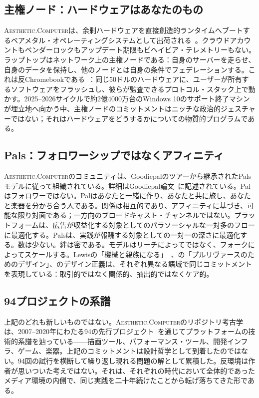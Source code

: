 \documentclass[10pt,letterpaper,twocolumn]{article}
\newcommand{\ac}{\textsc{Aesthetic.Computer}}
\begin{document}
\subsection{主権ノード：ハードウェアはあなたのもの}

\ac{}は、余剰ハードウェアを直接創造的ランタイムへブートするベアメタル・オペレーティングシステムとして出荷される~\citep{scudder2026os, scudder2026identity}。クラウドアカウントもベンダーロックもアップデート期限もビヘイビア・テレメトリーもない。ラップトップはネットワーク上の主権ノードである：自身のサーバーを走らせ、自身のデータを保持し、他のノードとは自身の条件でフェデレーションする。これは反Chromebookである~\citep{scudder2026openschools}：同じ50ドルのハードウェアに、ユーザーが所有するソフトウェアをフラッシュし、彼らが監査できるプロトコル・スタック上で動かす。2025--2026サイクルで約2億4000万台のWindows 10のサポート終了マシンが埋立地へ向かう中、主権ノードのコミットメントはニッチな政治的ジェスチャーではない；それはハードウェアをどうするかについての物質的プログラムである。

\subsection{Pals：フォロワーシップではなくアフィニティ}

\ac{}のコミュニティは、Goodiepalのツアーから継承されたPalsモデルに従って組織されている。詳細はGoodiepal論文~\citep{scudder2026goodiepal}に記述されている。Palはフォロワーではない。Palはあなたと一緒に作り、あなたと共に旅し、あなたと楽器を分かち合う人である。関係は相互的であり、アフィニティに基づき、可能な限り対面である；一方向のブロードキャスト・チャンネルではない。プラットフォームは、広告が収益化する対象としてのパラソーシャルな一対多のフローに最適化する。Palsは、実践が報酬する対象としての一対一の深さに最適化する。数は少ない。絆は密である。モデルはリーチによってではなく、フォークによってスケールする。Lewisの「機械と親族になる」~\citep{lewis2018making}、\citet{escobar2018designs}の「プルリヴァースのためのデザイン」、\citet{costanzachock2020design}のデザイン正義は、それぞれ異なる語域で同じコミットメントを表現している：取引的ではなく関係的、抽出的ではなくケア的。

\subsection{94プロジェクトの系譜}

上記のどれも新しいものではない。\ac{}のリポジトリ考古学は、2007--2020年にわたる94の先行プロジェクト~\citep{scudder2026archaeology}を通じてプラットフォームの技術的系譜を辿っている——描画ツール、パフォーマンス・ツール、開発インフラ、ゲーム、楽器。上記のコミットメントは設計哲学として到着したのではない。94回の試行を横断して繰り返し現れる問題の解として累積した。反環境は作者が思いついた考えではない。それは、それぞれの時代において全体的であったメディア環境の内側で、同じ実践を二十年続けたことから転げ落ちてきた形である。
\end{document}
